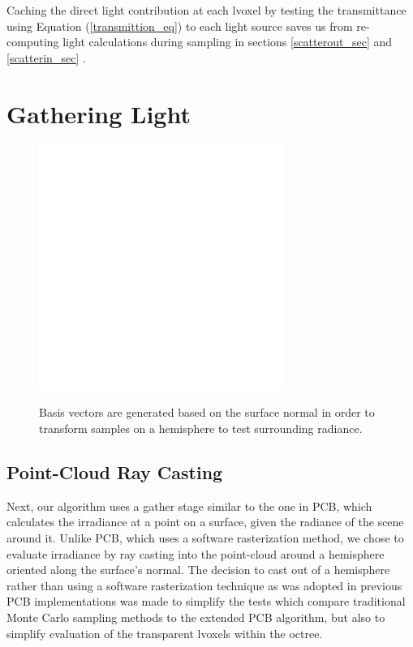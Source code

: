 \documentclass[12pt]{ucthesis}
\newcommand{\captionfonts}{\small\bf\ssp}
\begin{document}
Caching the direct light contribution at each lvoxel by testing the transmittance using Equation (\ref{transmittion_eq}) to each light source saves us from re-computing light calculations during sampling in sections \ref{scatterout_sec} and \ref{scatterin_sec} \cite{signotes:2010}.

\section{Gathering Light}

\begin{figure}[h!]
    \centering
    \includegraphics[width=80mm]{img/diag/orthnormal.pdf}
    \captionfonts
    \caption{Basis vectors are generated based on the surface normal in order to transform samples on a hemisphere to test surrounding radiance.}
    \label{fig:orthonormal}
\end{figure}

\subsection{Point-Cloud Ray Casting}

Next, our algorithm uses a gather stage similar to the one in PCB, which calculates the irradiance at a point on a surface, given the radiance of the scene around it.  Unlike PCB, which uses a software rasterization method, we chose to evaluate irradiance by ray casting into the point-cloud around a hemisphere oriented along the surface's normal.  The decision to cast out of a hemisphere rather than using a software rasterization technique as was adopted in previous PCB implementations was made to simplify the tests which compare traditional Monte Carlo sampling methods to the extended PCB algorithm, but also to simplify evaluation of the transparent lvoxels within the octree.
\end{document}
